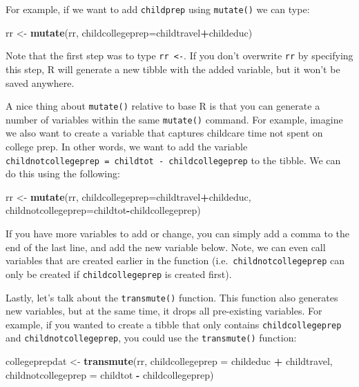 \documentclass[
]{book}
\newenvironment{Shaded}{\begin{snugshade}}{\end{snugshade}}
\newcommand{\AttributeTok}[1]{\textcolor[rgb]{0.13,0.29,0.53}{#1}}
\newcommand{\FunctionTok}[1]{\textcolor[rgb]{0.13,0.29,0.53}{\textbf{#1}}}
\newcommand{\NormalTok}[1]{#1}
\newcommand{\OtherTok}[1]{\textcolor[rgb]{0.56,0.35,0.01}{#1}}
\newcommand{\SpecialCharTok}[1]{\textcolor[rgb]{0.81,0.36,0.00}{\textbf{#1}}}
\begin{document}
For example, if we want to add \texttt{childprep} using \texttt{mutate()} we can type:

\begin{Shaded}
\begin{Highlighting}[]
\NormalTok{rr }\OtherTok{\textless{}{-}} \FunctionTok{mutate}\NormalTok{(rr, }\AttributeTok{childcollegeprep=}\NormalTok{childtravel}\SpecialCharTok{+}\NormalTok{childeduc)}
\end{Highlighting}
\end{Shaded}

Note that the first step was to type \texttt{rr\ \textless{}-}. If you don't overwrite \texttt{rr} by specifying this step, R will generate a new tibble with the added variable, but it won't be saved anywhere.

A nice thing about \texttt{mutate()} relative to base R is that you can generate a number of variables within the same \texttt{mutate()} command. For example, imagine we also want to create a variable that captures childcare time not spent on college prep. In other words, we want to add the variable \texttt{childnotcollegeprep\ =\ childtot\ -\ childcollegeprep} to the tibble. We can do this using the following:

\begin{Shaded}
\begin{Highlighting}[]
\NormalTok{rr }\OtherTok{\textless{}{-}} \FunctionTok{mutate}\NormalTok{(rr, }\AttributeTok{childcollegeprep=}\NormalTok{childtravel}\SpecialCharTok{+}\NormalTok{childeduc,}
             \AttributeTok{childnotcollegeprep=}\NormalTok{childtot}\SpecialCharTok{{-}}\NormalTok{childcollegeprep)}
\end{Highlighting}
\end{Shaded}

If you have more variables to add or change, you can simply add a comma to the end of the last line, and add the new variable below. Note, we can even call variables that are created earlier in the function (i.e.~\texttt{childnotcollegeprep} can only be created if \texttt{childcollegeprep} is created first).

Lastly, let's talk about the \texttt{transmute()} function. This function also generates new variables, but at the same time, it drops all pre-existing variables. For example, if you wanted to create a tibble that only contains \texttt{childcollegeprep} and \texttt{childnotcollegeprep}, you could use the \texttt{transmute()} function:

\begin{Shaded}
\begin{Highlighting}[]
\NormalTok{collegeprepdat }\OtherTok{\textless{}{-}} \FunctionTok{transmute}\NormalTok{(rr,}
                            \AttributeTok{childcollegeprep =}\NormalTok{ childeduc }\SpecialCharTok{+}\NormalTok{ childtravel,}
                            \AttributeTok{childnotcollegeprep =}\NormalTok{ childtot }\SpecialCharTok{{-}}\NormalTok{ childcollegeprep)}
\end{Highlighting}
\end{Shaded}
\end{document}
